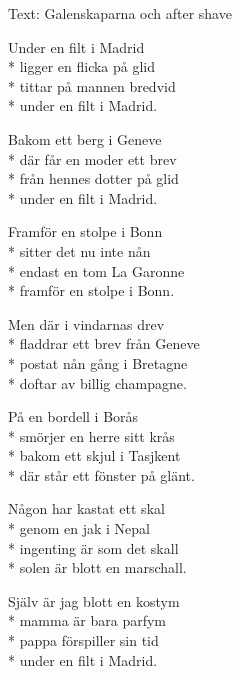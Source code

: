 \begin{SongText}
\begin{SongInfo}
    Text: Galenskaparna och after shave 
\end{SongInfo}
\begin{SongVerse}
Under en filt i Madrid\\*%
ligger en flicka på glid\\*%
tittar på mannen bredvid\\*%
under en filt i Madrid.
\end{SongVerse}
\begin{SongVerse}
Bakom ett berg i Geneve\\*%
där får en moder ett brev\\*%
från hennes dotter på glid\\*%
under en filt i Madrid. 
\end{SongVerse}
\begin{SongVerse}
Framför en stolpe i Bonn\\*%
sitter det nu inte nån\\*%
endast en tom La Garonne\\*%
framför en stolpe i Bonn.
\end{SongVerse}
\begin{SongVerse}
Men där i vindarnas drev\\*%
fladdrar ett brev från Geneve\\*%
postat nån gång i Bretagne\\*%
doftar av billig champagne.
\end{SongVerse}
\begin{SongVerse}
På en bordell i Borås\\*%
smörjer en herre sitt krås\\*%
bakom ett skjul i Tasjkent\\*%
där står ett fönster på glänt.
\end{SongVerse}
\begin{SongVerse}
Någon har kastat ett skal\\*%
genom en jak i Nepal\\*%
ingenting är som det skall\\*%
solen är blott en marschall.
\end{SongVerse}
\begin{SongVerse}
Själv är jag blott en kostym\\*%
mamma är bara parfym\\*%
pappa förspiller sin tid\\*%
under en filt i Madrid.

\end{SongVerse}
\end{SongText}
